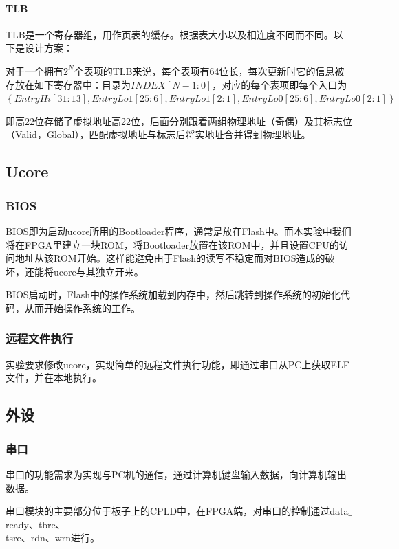 \paragraph{TLB}



TLB是一个寄存器组，用作页表的缓存。根据表大小以及相连度不同而不同。以下是设计方案：

对于一个拥有$2^{N}$个表项的TLB来说，每个表项有64位长，每次更新时它的信息被存放在如下寄存器中：目录为$INDEX\left[ N-1:0 \right]$，对应的每个表项即每个入口为\\
$\left\lbrace EntryHi\left[ 31:13 \right], EntryLo1\left[ 25:6 \right],EntryLo1\left[ 2:1 \right], EntryLo0\left[ 25:6 \right], EntryLo0\left[ 2:1 \right] \right\rbrace $

即高22位存储了虚拟地址高22位，后面分别跟着两组物理地址（奇偶）及其标志位（Valid，Global），匹配虚拟地址与标志后将实地址合并得到物理地址。
\subsection{Ucore}
\subsubsection{BIOS}
BIOS即为启动ucore所用的Bootloader程序，通常是放在Flash中。而本实验中我们将在FPGA里建立一块ROM，将Bootloader放置在该ROM中，并且设置CPU的访问地址从该ROM开始。这样能避免由于Flash的读写不稳定而对BIOS造成的破坏，还能将ucore与其独立开来。

BIOS启动时，Flash中的操作系统加载到内存中，然后跳转到操作系统的初始化代码，从而开始操作系统的工作。
\subsubsection{远程文件执行}
实验要求修改ucore，实现简单的远程文件执行功能，即通过串口从PC上获取ELF文件，并在本地执行。
\subsection{外设}
\subsubsection{串口}
串口的功能需求为实现与PC机的通信，通过计算机键盘输入数据，向计算机输出数据。

串口模块的主要部分位于板子上的CPLD中，在FPGA端，对串口的控制通过data$\_$ready、tbre、\\
tsre、rdn、wrn进行。

